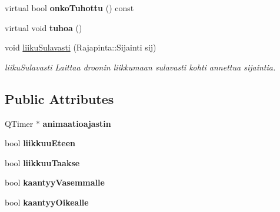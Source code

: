 \begin{DoxyCompactItemize}
\item 
\hypertarget{class_drooni_aa054670e7c126212f5684fa7be0a1ebf}{virtual bool {\bfseries onko\-Tuhottu} () const }\label{class_drooni_aa054670e7c126212f5684fa7be0a1ebf}

\item 
\hypertarget{class_drooni_a5bfb14c85e9d186a0f207fd62d7baa1d}{virtual void {\bfseries tuhoa} ()}\label{class_drooni_a5bfb14c85e9d186a0f207fd62d7baa1d}

\item 
void \hyperlink{class_drooni_aea58ffdb85ce0db9e4778e0bdf8aea11}{liiku\-Sulavasti} (Rajapinta\-::\-Sijainti sij)
\begin{DoxyCompactList}\small\item\em liiku\-Sulavasti Laittaa droonin liikkumaan sulavasti kohti annettua sijaintia. \end{DoxyCompactList}\end{DoxyCompactItemize}
\subsection*{Public Attributes}
\begin{DoxyCompactItemize}
\item 
\hypertarget{class_drooni_a9e229d50972415a7d6cef679a6935f07}{Q\-Timer $\ast$ {\bfseries animaatioajastin}}\label{class_drooni_a9e229d50972415a7d6cef679a6935f07}

\item 
\hypertarget{class_drooni_aaf12601ff6c06afaf92e150b2e4a8741}{bool {\bfseries liikkuu\-Eteen}}\label{class_drooni_aaf12601ff6c06afaf92e150b2e4a8741}

\item 
\hypertarget{class_drooni_af963430a0c950d2a2a2635f449c80ca1}{bool {\bfseries liikkuu\-Taakse}}\label{class_drooni_af963430a0c950d2a2a2635f449c80ca1}

\item 
\hypertarget{class_drooni_a7ce57251ed439106608127008b683871}{bool {\bfseries kaantyy\-Vasemmalle}}\label{class_drooni_a7ce57251ed439106608127008b683871}

\item 
\hypertarget{class_drooni_a9419bf493ac63ff84aae5d4581e2266c}{bool {\bfseries kaantyy\-Oikealle}}\label{class_drooni_a9419bf493ac63ff84aae5d4581e2266c}

\end{DoxyCompactItemize}

